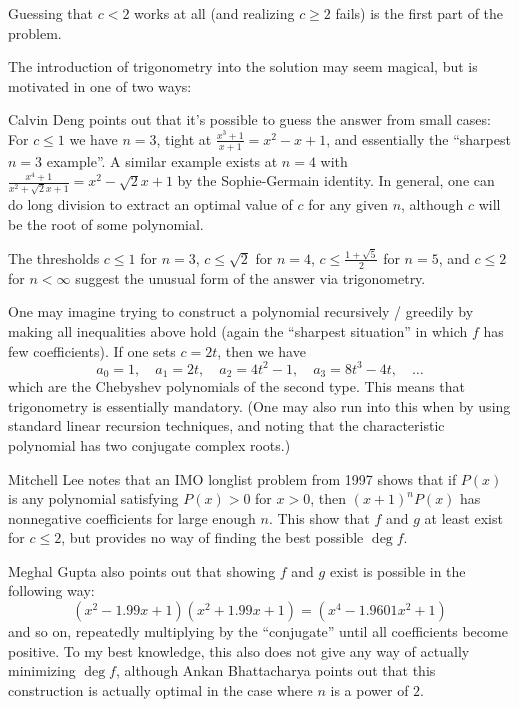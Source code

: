 \documentclass[11pt]{scrartcl}
\begin{document}
\begin{remark*}
  Guessing that $c < 2$ works at all (and realizing $c \ge 2$ fails)
  is the first part of the problem.

  The introduction of trigonometry into the solution may seem magical,
  but is motivated in one of two ways:
  \begin{itemize}
    \ii Calvin Deng points out that it's possible to
    guess the answer from small cases:
    For $c \le 1$ we have $n = 3$, tight at $\frac{x^3+1}{x+1} = x^2-x+1$,
    and essentially the ``sharpest $n=3$ example''.
    A similar example exists at $n = 4$ with
    $\frac{x^4+1}{x^2+\sqrt 2 x+1} = x^2-\sqrt2x+1$
    by the Sophie-Germain identity.
    In general, one can do long division to extract
    an optimal value of $c$ for any given $n$,
    although $c$ will be the root of some polynomial.

    The thresholds $c \le 1$ for $n = 3$, $c \le \sqrt 2$ for $n = 4$,
    $c \le \frac{1+\sqrt5}{2}$ for $n = 5$,
    and $c \le 2$ for $n < \infty$ suggest the unusual form of the
    answer via trigonometry.

    \ii One may imagine trying to construct a polynomial
    recursively / greedily by making all inequalities above hold
    (again the ``sharpest situation'' in which $f$ has few coefficients).
    If one sets $c = 2t$, then we have
    \[ a_0 = 1, \quad a_1 = 2t, \quad a_2 = 4t^2-1, \quad
      a_3 = 8t^3-4t, \quad \dots \]
    which are the Chebyshev polynomials of the second type.
    This means that trigonometry is essentially mandatory.
    (One may also run into this when by using standard linear recursion techniques,
    and noting that the characteristic polynomial
    has two conjugate complex roots.)
  \end{itemize}
\end{remark*}

\begin{remark*}
  Mitchell Lee notes that an IMO longlist problem from 1997 shows that
  if $P(x)$ is any polynomial satisfying $P(x) > 0$ for $x > 0$,
  then $(x+1)^n P(x)$ has nonnegative coefficients
  for large enough $n$.
  This show that $f$ and $g$ at least exist for $c \le 2$,
  but provides no way of finding the best possible $\deg f$.

  Meghal Gupta also points out that showing $f$ and $g$ exist
  is possible in the following way:
  \[ \left( x^2-1.99x+1 \right) \left( x^2+1.99x+1 \right)
    = \left( x^4 - 1.9601x^2 + 1 \right) \]
  and so on, repeatedly multiplying by the ``conjugate''
  until all coefficients become positive.
  To my best knowledge, this also does not give any way
  of actually minimizing $\deg f$,
  although Ankan Bhattacharya points out that this construction
  is actually optimal in the case where $n$ is a power of $2$.
\end{remark*}
\end{document}
